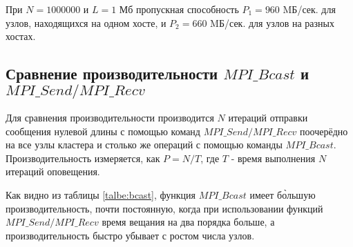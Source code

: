 			При $ N = 1000000 $ и $L = 1 $ Мб пропускная способность $P_1 = 960$ MБ/сек. для узлов, находящихся на одном хосте, и $P_2 = 660$ MБ/сек. для узлов на разных хостах.
			
		\subsection{Сравнение производительности $ MPI\_Bcast $ и $ MPI\_Send/MPI\_Recv $}
			\label{sec:bcast}
			Для сравнения производительности производится $ N $ итераций отправки сообщения нулевой длины с помощью команд $ MPI\_Send/MPI\_Recv $ поочерёдно на все узлы кластера и столько же операций с помощью команды $ MPI\_Bcast $. Производительность измеряется, как $ P = N / T $, где $ T $ - время выполнения $ N $ итераций оповещения.
			
			
			Как видно из таблицы \ref{talbe:bcast}, функция $ MPI\_Bcast $ имеет б\`{о}льшую производительность, почти постоянную, когда при использовании функций $ MPI\_Send/MPI\_Recv $ время вещания на два порядка больше, а производительность быстро убывает с ростом числа узлов.
